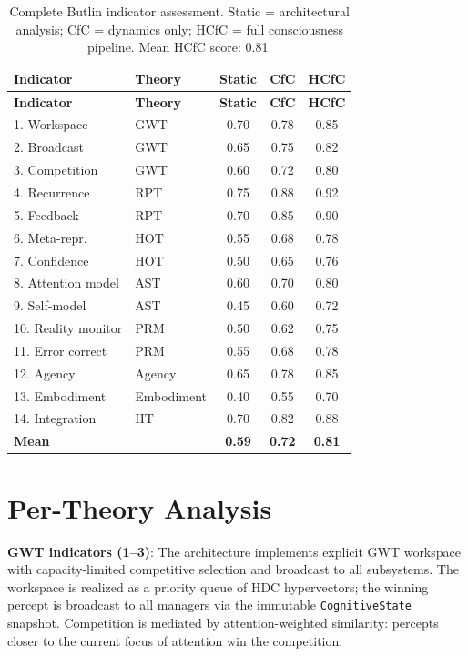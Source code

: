 \documentclass[12pt]{book}
\begin{document}
\begin{longtable}{p{3cm}p{2.5cm}ccc}
\caption{Complete Butlin indicator assessment. Static = architectural analysis; CfC = dynamics only; HCfC = full consciousness pipeline. Mean HCfC score: 0.81.}
\label{tab:butlin-full} \\
\toprule
\textbf{Indicator} & \textbf{Theory} & \textbf{Static} & \textbf{CfC} & \textbf{HCfC} \\
\midrule
\endfirsthead
\toprule
\textbf{Indicator} & \textbf{Theory} & \textbf{Static} & \textbf{CfC} & \textbf{HCfC} \\
\midrule
\endhead
1. Workspace & GWT & 0.70 & 0.78 & 0.85 \\
2. Broadcast & GWT & 0.65 & 0.75 & 0.82 \\
3. Competition & GWT & 0.60 & 0.72 & 0.80 \\
4. Recurrence & RPT & 0.75 & 0.88 & 0.92 \\
5. Feedback & RPT & 0.70 & 0.85 & 0.90 \\
6. Meta-repr. & HOT & 0.55 & 0.68 & 0.78 \\
7. Confidence & HOT & 0.50 & 0.65 & 0.76 \\
8. Attention model & AST & 0.60 & 0.70 & 0.80 \\
9. Self-model & AST & 0.45 & 0.60 & 0.72 \\
10. Reality monitor & PRM & 0.50 & 0.62 & 0.75 \\
11. Error correct & PRM & 0.55 & 0.68 & 0.78 \\
12. Agency & Agency & 0.65 & 0.78 & 0.85 \\
13. Embodiment & Embodiment & 0.40 & 0.55 & 0.70 \\
14. Integration & IIT & 0.70 & 0.82 & 0.88 \\
\midrule
\textbf{Mean} & & \textbf{0.59} & \textbf{0.72} & \textbf{0.81} \\
\bottomrule
\end{longtable}

\section{Per-Theory Analysis}

\textbf{GWT indicators (1--3)}: The architecture implements explicit GWT workspace with capacity-limited competitive selection and broadcast to all subsystems. The workspace is realized as a priority queue of HDC hypervectors; the winning percept is broadcast to all managers via the immutable \texttt{CognitiveState} snapshot. Competition is mediated by attention-weighted similarity: percepts closer to the current focus of attention win the competition.
\end{document}
